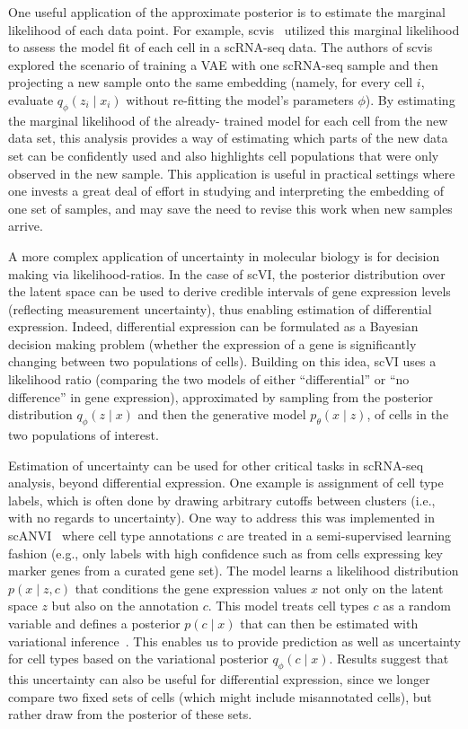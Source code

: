 One useful application of the approximate posterior is to estimate the marginal likelihood of each data point. For example, scvis~\cite{Ding2018} utilized this marginal likelihood to assess the model fit of each cell in a scRNA-seq data. The authors of scvis explored the scenario of training a VAE with one scRNA-seq sample and then projecting a new sample onto the same embedding (namely, for every cell $i$, evaluate $q_\phi(z_i \mid x_i)$ without re-fitting the model's parameters $\phi$). By estimating the marginal likelihood of the already- trained model for each cell from the new data set, this analysis provides a way of estimating which parts of the new data set can be confidently used and also highlights cell populations that were only observed in the new sample. This application is useful in practical settings where one invests a great deal of effort in studying and interpreting the embedding of one set of samples, and may save the need to revise this work when new samples arrive. 


A more complex application of uncertainty in molecular biology is for decision making via likelihood-ratios. In the case of scVI, the posterior distribution over the latent space can be used to derive credible intervals of gene expression levels (reflecting measurement uncertainty), thus enabling estimation of differential expression. Indeed, differential expression can be formulated as a Bayesian decision making problem (whether the expression of a gene is significantly changing between two populations of cells). Building on this idea, scVI uses a likelihood ratio (comparing the two models of either ``differential'' or ``no difference'' in gene expression), approximated by sampling from the posterior distribution $q_\phi(z \mid x)$ and then the generative model $p_\theta(x\mid z)$, of cells in the two populations of interest. 

Estimation of uncertainty can be used for other critical tasks in scRNA-seq analysis, beyond differential expression. One example is assignment of cell type labels, which is often done by drawing arbitrary cutoffs between clusters (i.e., with no regards to uncertainty). One way to address this was implemented in scANVI~\cite{Xu2019} where cell type annotations $c$ are treated in a semi-supervised learning fashion (e.g., only labels with high confidence such as from cells expressing key marker genes from a curated gene set).  The model learns a likelihood distribution $p(x\mid z,c)$ that conditions the gene expression values $x$ not only on the latent space $z$ but also on the annotation $c$. This model treats cell types $c$ as a random variable and defines a posterior $p(c \mid x)$ that can then be estimated with variational inference~\cite{kingma2014semi}. This enables us to provide prediction as well as uncertainty for cell types based on the variational posterior $q_\phi(c \mid x)$. Results suggest that this uncertainty can also be useful for differential expression, since we longer compare two fixed sets of cells (which might include misannotated cells), but rather draw from the posterior of these sets. 

